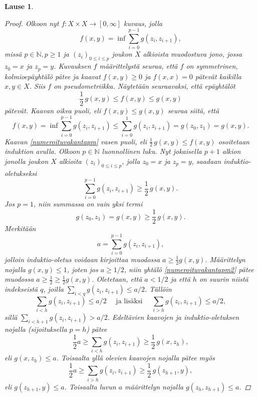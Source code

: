 \documentclass[12pt,a4paper,leqno]{report}
\newcommand{\N}{\mathbb{N}}
\theoremstyle{plain}
\newtheorem{lause}[equation]{Lause}
\theoremstyle{definition}
\theoremstyle{remark}
\begin{document}
\begin{lause}
\begin{proof}
Olkoon nyt $f\colon X\times X\rightarrow [0,\infty]$ kuvaus, 
jolla 
$$f(x,y)=\inf\sum_{i=0}^{p-1}g(z_i,z_{i+1}),$$
missä $p\in\N,p\geq 1$ ja $(z_i)_{0\leq i\leq p}$ 
joukon $X$ alkioista muodostuva jono, jossa $z_0=x$ ja $z_p=y$. 
Kuvauksen $f$ määrittelystä seuraa, 
että $f$ on symmetrinen, kolmioepäyhtälö pätee ja kaavat 
$f(x,y)\geq 0$ ja $f(x,x)=0$ pätevät kaikilla $x,y\in X$.
Siis $f$ on pseudometriikka. 
Näytetään seuraavaksi, että epäyhtälöt 
\begin{equation}\label{numeroituvakantapm}
\frac{1}{2}\,g(x,y)\leq f(x,y)\leq g(x,y)
\end{equation}
pätevät. 
Kaavan oikea puoli, eli $f(x,y)\leq g(x,y)$ seuraa siitä, 
että 
$$f(x,y)=\inf\sum_{i=0}^{p-1}g(z_i,z_{i+1})\leq\sum_{i=0}^1g(z_i,z_{i+1})=g(z_0,z_1)=g(x,y).$$
Kaavan \ref{numeroituvakantapm} vasen puoli, 
eli $\frac{1}{2}\,g(x,y)\leq f(x,y)$ 
osoitetaan induktion avulla. 
Olkoon $p\in\N$ luonnollinen luku. 
Nyt jokaisella $p+1$ alkion jonolla joukon $X$ 
alkioita $ (z_i)_{0\leq i\leq p}$, 
jolla $z_0=x$ ja $z_p=y$, saadaan induktio-oletukseksi 
\begin{equation}\label{numeroituvakantapm2}
\sum_{i=0}^{p-1}g(z_i,z_{i+1})\geq \frac{1}{2}\,g(x,y).
\end{equation}
Jos $p=1$, niin summassa on vain yksi termi
$$g(z_0,z_{1})=g(x,y)\geq \frac{1}{2}\,g(x,y).$$
Merkitään 
\begin{equation}\label{numeroituvakantapm3}
a=\sum_{i=0}^{p-1}g(z_i,z_{i+1}),
\end{equation}
jolloin induktio-oletus voidaan kirjoittaa 
muodossa $a\geq \frac{1}{2}g(x,y) $. 
Määrittelyn nojalla $g(x,y)\leq 1$, joten jos $a\geq 1/2$, 
niin yhtälö \ref{numeroituvakantapm2} pätee muodossa 
$a\geq \frac{1}{2}\geq \frac{1}{2}g(x,y)$. 
Oletetaan, että $a<1/2$ ja että $h$ on suurin niistä indekseistä $q$, 
joilla $\sum_{i<q}g(z_i,z_{i+1})\leq a/2$. 
Tällöin 
\begin{equation*}\label{numeroituvakantapm4}
\sum_{i<h}g(z_i,z_{i+1})\leq a/2\quad\text{ ja lisäksi }\quad
\sum_{i>h}g(z_i,z_{i+1})\leq a/2,
\end{equation*}
sillä $\sum_{i<h+1}g(z_i,z_{i+1})> a/2$. 
Edeltävien kaavojen ja induktio-oletuksen nojalla 
(sijoituksella $p=h$) pätee
\begin{equation*}
\frac{1}{2}a\geq \sum_{i<h}g(z_i,z_{i+1})\geq \frac{1}{2}\,g(x,z_h),
\end{equation*}
eli $g(x,z_h)\leq a$. 
Toisaalta yllä olevien kaavojen nojalla pätee myös 
\begin{equation*}
\frac{1}{2}a\geq \sum_{i>h}g(z_i,z_{i+1})\geq \frac{1}{2}\,g(z_{h+1},y),
\end{equation*}
eli $g(z_{h+1},y)\leq a$. 
Toisaalta luvun $a$ 
määrittelyn nojalla 
$g(z_h,z_{h+1})\leq a$. 


\end{proof}
\end{lause}
\end{document}
